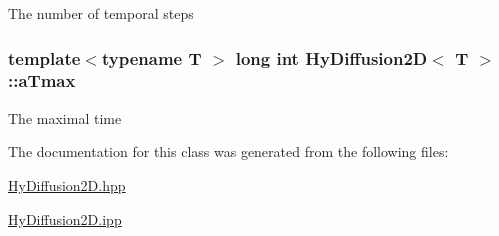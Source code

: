 \label{classHyDiffusion2D_a3fdb9b91352535d51ab737c8e2bbb096}
The number of temporal steps \hypertarget{classHyDiffusion2D_a484433cb70b279d460ae7ad99c692b44}{
\subsubsection[{aTmax}]{\setlength{\rightskip}{0pt plus 5cm}template$<$typename T $>$ long int {\bf HyDiffusion2D}$<$ T $>$::{\bf aTmax}}}
\label{classHyDiffusion2D_a484433cb70b279d460ae7ad99c692b44}
The maximal time 

The documentation for this class was generated from the following files:\begin{DoxyCompactItemize}
\item 
\hyperlink{HyDiffusion2D_8hpp}{HyDiffusion2D.hpp}\item 
\hyperlink{HyDiffusion2D_8ipp}{HyDiffusion2D.ipp}\end{DoxyCompactItemize}
